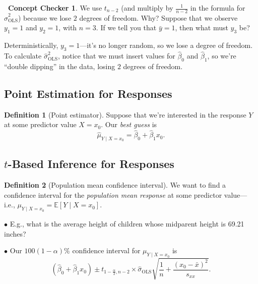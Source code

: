 \documentclass[12pt,oneside]{article}
\newcommand{\E}{\mathbb{E}}
\newcommand{\OLS}{\text{OLS}}
\theoremstyle{definition}
\newtheorem{definition}{Definition}
\newtheorem{concept}{\faPen \ Concept Checker}
\theoremstyle{remark}
\begin{document}
\begin{concept}
We use $t_{n - 2}$ (and multiply by $\frac{1}{n - 2}$ in the formula for $\hat{\sigma}^{2}_{\OLS}$) because we lose $2$ degrees of freedom. Why? Suppose that we observe $y_1 = 1$ and $y_2 = 1$, with $n = 3$. If we tell you that $\bar{y} = 1$, then what must $y_3$ be?
\end{concept}

\begin{solutionbox}
Deterministically, $y_3 = 1$—it's no longer random, so we lose a degree of freedom. To calculate $\hat{\sigma}^{2}_{\OLS}$, notice that we must insert values for $\hat{\beta}_0$ and $\hat{\beta}_1$, so we're \enquote{double dipping} in the data, losing $2$ degrees of freedom.
\end{solutionbox}

\subsection{Point Estimation for Responses}

\begin{definition}[Point estimator]
Suppose that we're interested in the response $Y$ at some predictor value $X = x_0$. Our \textit{best guess} is \[\hat{\mu}_{Y \mid X = x_0} = \hat{\beta}_0 + \hat{\beta}_1 x_0.\]
\end{definition}

\subsection{$t$-Based Inference for Responses}

\begin{definition}[Population mean confidence interval]
We want to find a confidence interval for the \textit{population mean response} at some predictor value—i.e., $\mu_{Y \mid X = x_0} = \E[Y \mid X = x_0]$.

$\bullet$ E.g., what is the average height of children whose midparent height is 69.21 inches?

$\bullet$ Our $100 (1 - \alpha) \%$ confidence interval for $\mu_{Y \mid X = x_0}$ is \[(\hat{\beta}_{0} + \hat{\beta}_{1} x_0) \pm t_{1 - \frac{\alpha}{2}, n - 2} \times \hat{\sigma}_{\OLS} \sqrt{\frac{1}{n} + \frac{(x_0 - \bar{x})^2}{s_{xx}}}.\]
\end{definition}
\end{document}
